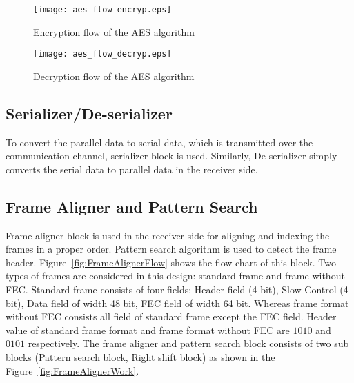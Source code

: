 \documentclass[a4paper]{jpconf}
\begin{document}
\begin{figure}[h]
\begin{minipage}{14pc}\texttt{[image: aes\_flow\_encryp.eps]}
\caption{\label{fig:aesencryption}Encryption flow of the AES algorithm}
\end{minipage}\hspace{7pc}\begin{minipage}{14pc}
\vspace{1pc}
\texttt{[image: aes\_flow\_decryp.eps]}
\caption{\label{fig:aesdecryption}Decryption flow of the AES algorithm}
\end{minipage} 
\end{figure}

\vspace{-1 pc}
\subsection{Serializer/De-serializer} To convert the parallel data to serial data, which is transmitted over the communication channel, serializer block is used. Similarly, De-serializer simply converts the serial data to parallel data in the receiver side.
\subsection{Frame Aligner and Pattern Search} \label{FrameAligner}
Frame aligner block is used in the receiver side for aligning and indexing the frames in a proper order. Pattern search algorithm is used to detect the frame header. Figure~\ref{fig:FrameAlignerFlow} shows the flow chart of this block. Two types of frames are considered in this design: standard frame and frame without FEC. Standard frame consists of four fields: Header field (4 bit), Slow Control (4 bit), Data field of width 48 bit, FEC field of width 64 bit. Whereas frame format without FEC consists all field of standard frame  except the FEC field. Header value of standard frame format and frame format without FEC are $1010$ and $0101$ respectively. The frame aligner and pattern search block consists of two sub blocks (Pattern search block, Right shift block) as shown in the Figure~\ref{fig:FrameAlignerWork}.
\end{document}
